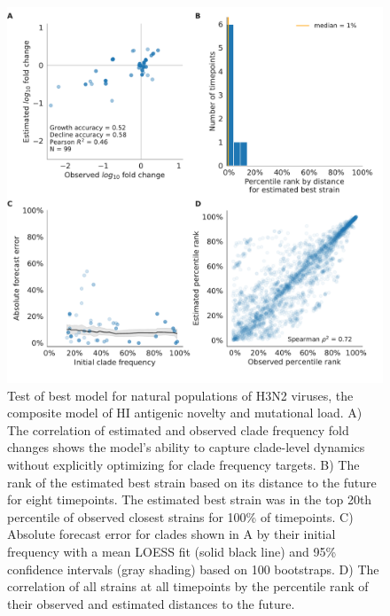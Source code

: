 \begin{figure}[p]
  \begin{center}
  \includegraphics[width=\textwidth]{figures/test-of-best-model-for-natural-populations.pdf}
  \caption{
  Test of best model for natural populations of H3N2 viruses, the composite model of HI antigenic novelty and mutational load.
  A) The correlation of estimated and observed clade frequency fold changes shows the model's ability to capture clade-level dynamics without explicitly optimizing for clade frequency targets.
  B) The rank of the estimated best strain based on its distance to the future for eight timepoints.
  The estimated best strain was in the top 20th percentile of observed closest strains for 100\% of timepoints.
  C) Absolute forecast error for clades shown in A by their initial frequency with a mean LOESS fit (solid black line) and 95\% confidence intervals (gray shading) based on 100 bootstraps.
  D) The correlation of all strains at all timepoints by the percentile rank of their observed and estimated distances to the future.
  }
  \label{fig:test_of_best_model_for_natural_populations}
  \end{center}
\end{figure}

